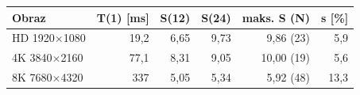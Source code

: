 \begin{tabular}{lrrrrr}
\toprule
Obraz & T(1) [ms] & S(12) & S(24) & maks. S (N) & s [\%] \\
\midrule
HD 1920$\times$1080 & 19,2 & 6,65 & 9,73 & 9,86 (23) & 5,9 \\
4K 3840$\times$2160 & 77,1 & 8,31 & 9,05 & 10,00 (19) & 5,6 \\
8K 7680$\times$4320 & 337 & 5,05 & 5,34 & 5,92 (48) & 13,3 \\
\bottomrule
\end{tabular}
